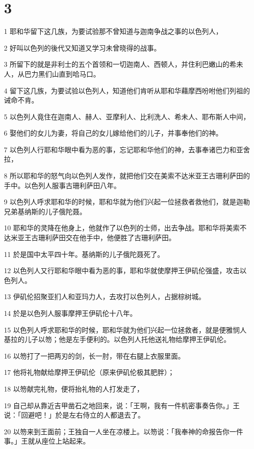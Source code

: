 \chapter{3}

\par 1 耶和华留下这几族，为要试验那不曾知道与迦南争战之事的以色列人，
\par 2 好叫以色列的後代又知道又学习未曾晓得的战事。
\par 3 所留下的就是非利士的五个首领和一切迦南人、西顿人，并住利巴嫩山的希未人，从巴力黑们山直到哈马口。
\par 4 留下这几族，为要试验以色列人，知道他们肯听从耶和华藉摩西吩咐他们列祖的诫命不肯。
\par 5 以色列人竟住在迦南人、赫人、亚摩利人、比利洗人、希未人、耶布斯人中间，
\par 6 娶他们的女儿为妻，将自己的女儿嫁给他们的儿子，并事奉他们的神。
\par 7 以色列人行耶和华眼中看为恶的事，忘记耶和华他们的神，去事奉诸巴力和亚舍拉，
\par 8 所以耶和华的怒气向以色列人发作，就把他们交在美索不达米亚王古珊利萨田的手中。以色列人服事古珊利萨田八年。
\par 9 以色列人呼求耶和华的时候，耶和华就为他们兴起一位拯救者救他们，就是迦勒兄弟基纳斯的儿子俄陀聂。
\par 10 耶和华的灵降在他身上，他就作了以色列的士师，出去争战。耶和华将美索不达米亚王古珊利萨田交在他手中，他便胜了古珊利萨田。
\par 11 於是国中太平四十年。基纳斯的儿子俄陀聂死了。
\par 12 以色列人又行耶和华眼中看为恶的事，耶和华就使摩押王伊矶伦强盛，攻击以色列人。
\par 13 伊矶伦招聚亚扪人和亚玛力人，去攻打以色列人，占据棕树城。
\par 14 於是以色列人服事摩押王伊矶伦十八年。
\par 15 以色列人呼求耶和华的时候，耶和华就为他们兴起一位拯救者，就是便雅悯人基拉的儿子以笏；他是左手便利的。以色列人托他送礼物给摩押王伊矶伦。
\par 16 以笏打了一把两刃的剑，长一肘，带在右腿上衣服里面。
\par 17 他将礼物献给摩押王伊矶伦（原来伊矶伦极其肥胖）；
\par 18 以笏献完礼物，便将抬礼物的人打发走了，
\par 19 自己却从靠近吉甲凿石之地回来，说：「王啊，我有一件机密事奏告你。」王说：「回避吧！」於是左右侍立的人都退去了。
\par 20 以笏来到王面前；王独自一人坐在凉楼上。以笏说：「我奉神的命报告你一件事。」王就从座位上站起来。
